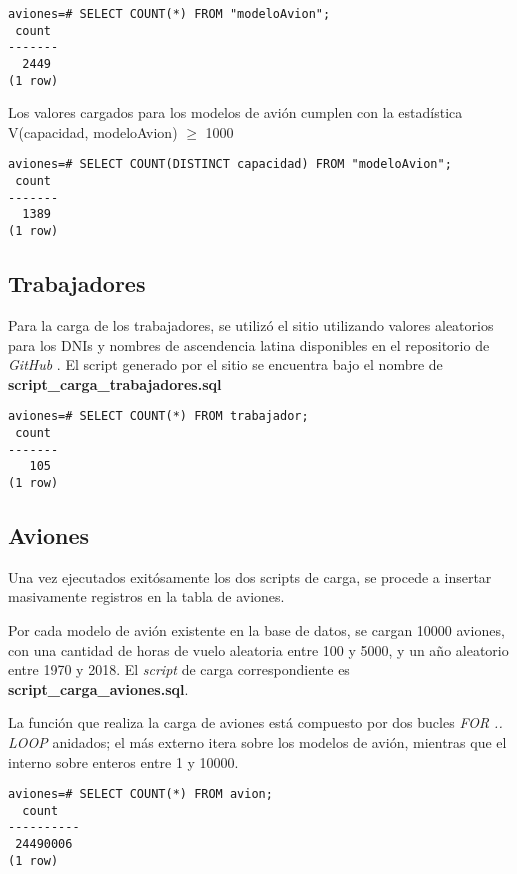 \vspace*{5mm}
\lstset{style=sql}
\begin{lstlisting}
aviones=# SELECT COUNT(*) FROM "modeloAvion";
 count 
-------
  2449
(1 row)
\end{lstlisting}

Los valores cargados para los modelos de avión cumplen con la estadística V(capacidad, modeloAvion) $\geq$ 1000

\vspace*{5mm}
\lstset{style=sql}
\begin{lstlisting}
aviones=# SELECT COUNT(DISTINCT capacidad) FROM "modeloAvion";
 count 
-------
  1389
(1 row)
\end{lstlisting}

\subsection{Trabajadores}

Para la carga de los trabajadores, se utilizó el sitio \cite{generatedata} utilizando valores aleatorios para los DNIs y nombres de ascendencia latina disponibles en el repositorio de \emph{GitHub} \cite{apellidos:2012}. El script generado por el sitio se encuentra bajo el nombre de \textbf{script\_carga\_trabajadores.sql} 

\vspace*{5mm}
\lstset{style=sql}
\begin{lstlisting}
aviones=# SELECT COUNT(*) FROM trabajador;
 count 
-------
   105
(1 row)
\end{lstlisting}


\subsection{Aviones}
Una vez ejecutados exitósamente los dos scripts de carga, se procede a insertar masivamente registros en la tabla de aviones. 

Por cada modelo de avión existente en la base de datos, se cargan 10000 aviones, con una cantidad de horas de vuelo aleatoria entre 100 y 5000, y un año aleatorio entre 1970 y 2018. El \emph{script} de carga correspondiente es \textbf{script\_carga\_aviones.sql}.

La función que realiza la carga de aviones está compuesto por dos bucles \emph{FOR .. LOOP} anidados; el más externo itera sobre los modelos de avión, mientras que el interno sobre enteros entre 1 y 10000. 

\vspace*{5mm}
\lstset{style=sql}
\begin{lstlisting}
aviones=# SELECT COUNT(*) FROM avion;
  count   
----------
 24490006
(1 row)
\end{lstlisting}

